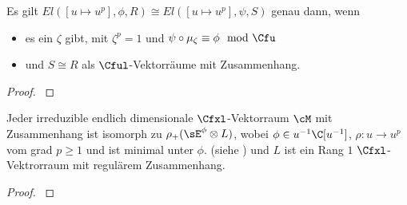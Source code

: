
\begin{lem} \cite[Lem 2.6.]{sabbah_Fourier-local}
Es gilt $El([u\mapsto u^p],\phi,R)\cong El([u\mapsto u^p],\psi,S)$ genau dann,
wenn
\begin{itemize}
\item es ein $\zeta$ gibt, mit $\zeta^p=1$ und
$\psi\circ\mu_\zeta\equiv\phi\mod\Cfu$
\item und $S\cong R$ als $\Cful$-Vektorräume mit Zusammenhang.
\end{itemize}
\end{lem}
\begin{proof}
\cite[Lem 2.6.]{sabbah_Fourier-local}
\end{proof}

\begin{prop} \cite[Prop 3.1]{sabbah_Fourier-local}
Jeder irreduzible endlich dimensionale $\Cfxl$-Vektorraum $\cM$ mit
Zusammenhang ist isomorph zu $\rho_+(\sE^\phi\otimes L)$, wobei $\phi\in
u^{-1}\C[u^{-1}]$, $\rho:u\rightarrow u^p$ vom grad $p\geq 1$ und ist minimal
unter $\phi$. (siehe \cite[Rem  2.8]{sabbah_Fourier-local}) und $L$ ist ein
Rang $1$ $\Cfxl$-Vektrorraum mit regulärem Zusammenhang.
\end{prop}
\begin{proof}
\cite[Prop 3.1]{sabbah_Fourier-local}
\end{proof}

